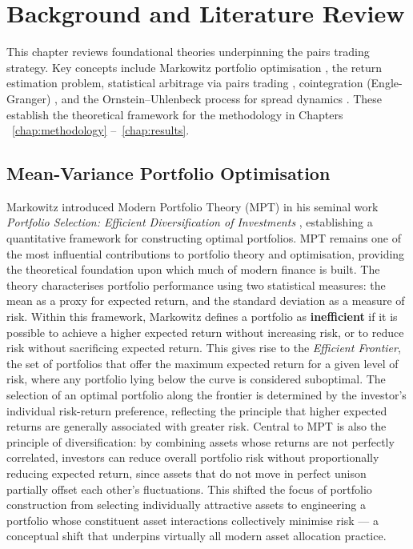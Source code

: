 \documentclass[a4paper]{report}
\begin{document}
\chapter{Background and Literature Review}
\label{chap:background}
This chapter reviews foundational theories underpinning the pairs trading strategy. Key concepts include Markowitz portfolio optimisation \cite{markowitz1959}, the return estimation problem, statistical arbitrage via pairs trading \cite{vidyamurthy2004}, cointegration (Engle-Granger) \cite{englegranger1987}, and the Ornstein--Uhlenbeck process for spread dynamics \cite{elliott2005}. These establish the theoretical framework for the methodology in Chapters ~\ref{chap:methodology} --~\ref{chap:results}.

\section{Mean-Variance Portfolio Optimisation}

Markowitz introduced Modern Portfolio Theory (MPT) in his seminal work \textit{Portfolio Selection: Efficient Diversification of Investments} \cite{markowitz1959}, establishing a quantitative framework for constructing optimal portfolios. MPT remains one of the most influential contributions to portfolio theory and optimisation, providing the theoretical foundation upon which much of modern finance is built. The theory characterises portfolio performance using two statistical measures: the mean as a proxy for expected return, and the standard deviation as a measure of risk. Within this framework, Markowitz defines a portfolio as \textbf{inefficient} if it is possible to achieve a higher expected return without increasing risk, or to reduce risk without sacrificing expected return. This gives rise to the \textit{Efficient Frontier}, the set of portfolios that offer the maximum expected return for a given level of risk, where any portfolio lying below the curve is considered suboptimal. The selection of an optimal portfolio along the frontier is determined by the investor's individual risk-return preference, reflecting the principle that higher expected returns are generally associated with greater risk. Central to MPT is also the principle of diversification: by combining assets whose returns are not perfectly correlated, investors can reduce overall portfolio risk without proportionally reducing expected return, since assets that do not move in perfect unison partially offset each other's fluctuations. This shifted the focus of portfolio construction from selecting individually attractive assets to engineering a portfolio whose constituent asset interactions collectively minimise risk — a conceptual shift that underpins virtually all modern asset allocation practice. 
\end{document}
